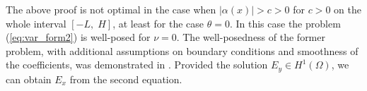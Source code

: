{\begin{remark} 
\label{remark:other}
The above proof is not optimal in the case when $\left|\alpha(x)\right|>c>0$ for $c>0$ on the whole interval $[-L,\; H]$, at least 
for the case $\theta=0$. In this case the problem (\ref{eq:var_form2}) is well-posed for $\nu=0$. The well-posedness of the former problem, with additional assumptions on boundary conditions and smoothness of the coefficients, 
was demonstrated in \cite{LMIG_thesis}. Provided the solution $E_y\in H^{1}(\Omega)$, we can obtain $E_x$ from the second equation.



\end{remark}}

